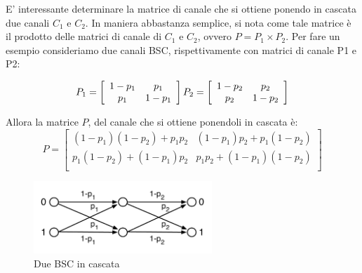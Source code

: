 E' interessante determinare la matrice di canale che si ottiene ponendo in cascata due canali $C_1$ e $C_2$. In maniera abbastanza semplice, si nota come tale matrice è il prodotto delle matrici di canale di $C_1$ e $C_2$, ovvero $P=P_1 \times P_2$. Per fare un esempio consideriamo due canali BSC, rispettivamente con matrici di canale P1 e P2:

\[ P_1 = \left[
  \begin{array}{cc}
    1-p_1 & p_1 \\
    p_1 & 1-p_1 \\
  \end{array} \right]
  \\
  P_2 = \left[
  \begin{array}{cc}
    1-p_2 & p_2 \\
    p_2 & 1-p_2 \\
  \end{array} \right]
\]

Allora la matrice $P$, del canale che si ottiene ponendoli in cascata è:
\[
 P = \left[
  \begin{array}{cc}
    (1-p_1)(1-p_2) + p_1 p_2 & (1-p_1)p_2 + p_1(1-p_2) \\
    p_1 (1-p_2)+(1-p_1)p_2 & p_1 p_2 +(1-p_1)(1-p_2)\\
  \end{array} \right]
\]

\begin{figure}[htbp]
\begin{center}
	\includegraphics[width=0.6\textwidth]{img/cascata2.pdf}
\caption{Due BSC in cascata}
\label{fig:cascata2}
\end{center}
\end{figure}

\bigskip



